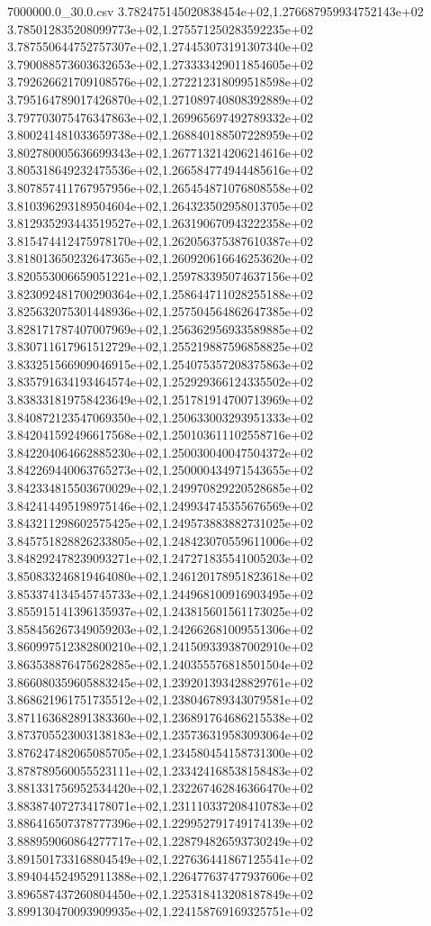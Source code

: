 \begin{filecontents*}{7000000.0_30.0.csv}
3.782475145020838454e+02,1.276687959934752143e+02
3.785012835208099773e+02,1.275571250283592235e+02
3.787550644752757307e+02,1.274453073191307340e+02
3.790088573603632653e+02,1.273333429011854605e+02
3.792626621709108576e+02,1.272212318099518598e+02
3.795164789017426870e+02,1.271089740808392889e+02
3.797703075476347863e+02,1.269965697492789332e+02
3.800241481033659738e+02,1.268840188507228959e+02
3.802780005636699343e+02,1.267713214206214616e+02
3.805318649232475536e+02,1.266584774944485616e+02
3.807857411767957956e+02,1.265454871076808558e+02
3.810396293189504604e+02,1.264323502958013705e+02
3.812935293443519527e+02,1.263190670943222358e+02
3.815474412475978170e+02,1.262056375387610387e+02
3.818013650232647365e+02,1.260920616646253620e+02
3.820553006659051221e+02,1.259783395074637156e+02
3.823092481700290364e+02,1.258644711028255188e+02
3.825632075301448936e+02,1.257504564862647385e+02
3.828171787407007969e+02,1.256362956933589885e+02
3.830711617961512729e+02,1.255219887596858825e+02
3.833251566909046915e+02,1.254075357208375863e+02
3.835791634193464574e+02,1.252929366124335502e+02
3.838331819758423649e+02,1.251781914700713969e+02
3.840872123547069350e+02,1.250633003293951333e+02
3.842041592496617568e+02,1.250103611102558716e+02
3.842204064662885230e+02,1.250030040047504372e+02
3.842269440063765273e+02,1.250000434971543655e+02
3.842334815503670029e+02,1.249970829220528685e+02
3.842414495198975146e+02,1.249934745355676569e+02
3.843211298602575425e+02,1.249573883882731025e+02
3.845751828826233805e+02,1.248423070559611006e+02
3.848292478239093271e+02,1.247271835541005203e+02
3.850833246819464080e+02,1.246120178951823618e+02
3.853374134545745733e+02,1.244968100916903495e+02
3.855915141396135937e+02,1.243815601561173025e+02
3.858456267349059203e+02,1.242662681009551306e+02
3.860997512382800210e+02,1.241509339387002910e+02
3.863538876475628285e+02,1.240355576818501504e+02
3.866080359605883245e+02,1.239201393428829761e+02
3.868621961751735512e+02,1.238046789343079581e+02
3.871163682891383360e+02,1.236891764686215538e+02
3.873705523003138183e+02,1.235736319583093064e+02
3.876247482065085705e+02,1.234580454158731300e+02
3.878789560055523111e+02,1.233424168538158483e+02
3.881331756952534420e+02,1.232267462846366470e+02
3.883874072734178071e+02,1.231110337208410783e+02
3.886416507378777396e+02,1.229952791749174139e+02
3.888959060864277717e+02,1.228794826593730249e+02
3.891501733168804549e+02,1.227636441867125541e+02
3.894044524952911388e+02,1.226477637477937606e+02
3.896587437260804450e+02,1.225318413208187849e+02
3.899130470093909935e+02,1.224158769169325751e+02

\end{filecontents*}
